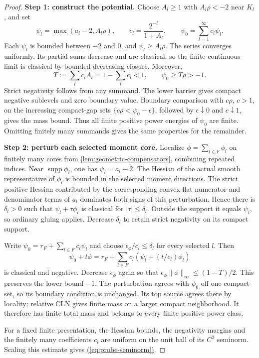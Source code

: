 \documentclass[11pt,reqno]{amsart}
\theoremstyle{definition}
\theoremstyle{remark}
\numberwithin{equation}{section}
\newcommand{\supp}{\operatorname{supp}}
\newcommand{\MathEqref}[1]{\begingroup\hypersetup{linkcolor=EquationLink}\hyperref[#1]{(\ref*{#1})}\endgroup}
\begin{document}
\begin{proof}
\textbf{Step 1: construct the potential.}
Choose $A_l\ge1$ with $A_l\rho<-2$ near $K_l$, and set
\[
 \psi_l=\max(a_l-2,A_l\rho),\qquad
 c_l=\frac{2^{-l}}{1+A_l},\qquad
 \psi_0=\sum_{l=1}^\infty c_l\psi_l.
\]
Each $\psi_l$ is bounded between $-2$ and $0$, and
$\psi_l\ge A_l\rho$. The series converges uniformly. Its partial
sums decrease and are classical, so the finite continuous limit is
classical by bounded decreasing closure. Moreover,
\[
 T:=\sum_lc_lA_l=1-\sum_lc_l<1,\qquad
                  \psi_0\ge T\rho> -1.
\]
Strict negativity follows from any summand. The lower barrier gives
compact negative sublevels and zero boundary value. Boundary
comparison with $c\rho$, $c>1$, on the increasing compact-gap sets
$\{c\rho<\psi_0-\epsilon\}$, followed by $\epsilon\downarrow0$
and $c\downarrow1$, gives the mass bound. Thus all finite positive
power energies of $\psi_0$ are finite. Omitting finitely many
summands gives the same properties for the remainder.

\textbf{Step 2: perturb each selected moment core.}
Localize $\phi=\sum_{l\in F}\phi_l$ on finitely many cores from
\cref{lem:geometric-compensators}, combining repeated indices. Near
$\supp\phi_l$, one has $\psi_l=a_l-2$. The Hessian of the actual
smooth representative of $\phi_l$ is bounded in the selected moment
directions. The strict positive Hessian contributed by the corresponding
convex-flat numerator and denominator terms of $a_l$ dominates both
signs of this perturbation. Hence there is $\delta_l>0$ such that
$\psi_l+\tau\phi_l$ is classical for $|\tau|\le\delta_l$.
Outside the support it equals $\psi_l$, so ordinary gluing applies.
Decrease $\delta_l$ to retain strict negativity on its compact
support.

Write $\psi_0=r_F+\sum_{l\in F}c_l\psi_l$ and choose
$\epsilon_\phi/c_l\le\delta_l$ for every selected $l$. Then
\[
 \psi_0+t\phi
       =r_F+\sum_{l\in F}c_l
                      (\psi_l+(t/c_l)\phi_l)
\]
is classical and negative. Decrease $\epsilon_\phi$ again so that
$\epsilon_\phi\|\phi\|_\infty\le(1-T)/2$. This preserves the
lower bound $-1$. The perturbation agrees with $\psi_0$ off one
compact set, so its boundary condition is unchanged. Its top source
agrees there by locality; relative CLN gives finite mass on a larger
compact neighborhood. It therefore has finite total mass and belongs
to every finite positive power class.

For a fixed finite presentation, the Hessian bounds, the negativity
margins and the finitely many coefficients $c_l$ are uniform on the
unit ball of its $C^2$ seminorm. Scaling this estimate gives
\MathEqref{eq:probe-seminorm}.
\end{proof}
\end{document}
